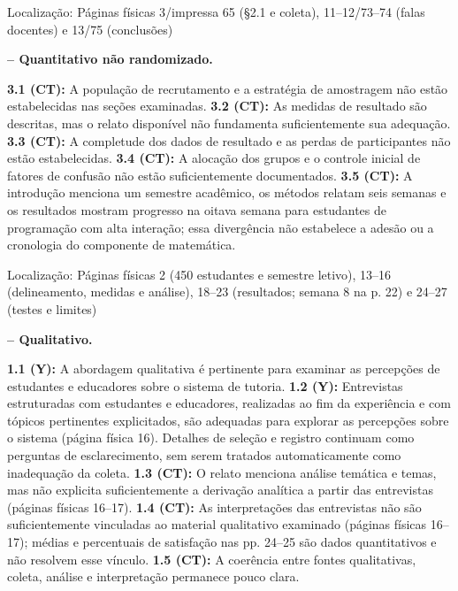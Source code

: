 \noindent Localização: Páginas físicas 3/\allowbreak{}impressa 65 (§2.1 e coleta), 11–12/\allowbreak{}73–74 (falas docentes) e 13/\allowbreak{}75 (conclusões)\par

\noindent\textbf{ -- Quantitativo não randomizado.}\nopagebreak[4]

\textbf{3.1 (CT):} A população de recrutamento e a estratégia de amostragem não estão estabelecidas nas seções examinadas. \textbf{3.2 (CT):} As medidas de resultado são descritas, mas o relato disponível não fundamenta suficientemente sua adequação. \textbf{3.3 (CT):} A completude dos dados de resultado e as perdas de participantes não estão estabelecidas. \textbf{3.4 (CT):} A alocação dos grupos e o controle inicial de fatores de confusão não estão suficientemente documentados. \textbf{3.5 (CT):} A introdução menciona um semestre acadêmico, os métodos relatam seis semanas e os resultados mostram progresso na oitava semana para estudantes de programação com alta interação; essa divergência não estabelece a adesão ou a cronologia do componente de matemática.

\noindent Localização: Páginas físicas 2 (450 estudantes e semestre letivo), 13–16 (delineamento, medidas e análise), 18–23 (resultados; semana 8 na p. 22) e 24–27 (testes e limites)\par

\noindent\textbf{ -- Qualitativo.}\nopagebreak[4]

\textbf{1.1 (Y):} A abordagem qualitativa é pertinente para examinar as percepções de estudantes e educadores sobre o sistema de tutoria. \textbf{1.2 (Y):} Entrevistas estruturadas com estudantes e educadores, realizadas ao fim da experiência e com tópicos pertinentes explicitados, são adequadas para explorar as percepções sobre o sistema (página física 16). Detalhes de seleção e registro continuam como perguntas de esclarecimento, sem serem tratados automaticamente como inadequação da coleta. \textbf{1.3 (CT):} O relato menciona análise temática e temas, mas não explicita suficientemente a derivação analítica a partir das entrevistas (páginas físicas 16–17). \textbf{1.4 (CT):} As interpretações das entrevistas não são suficientemente vinculadas ao material qualitativo examinado (páginas físicas 16–17); médias e percentuais de satisfação nas pp. 24–25 são dados quantitativos e não resolvem esse vínculo. \textbf{1.5 (CT):} A coerência entre fontes qualitativas, coleta, análise e interpretação permanece pouco clara.

